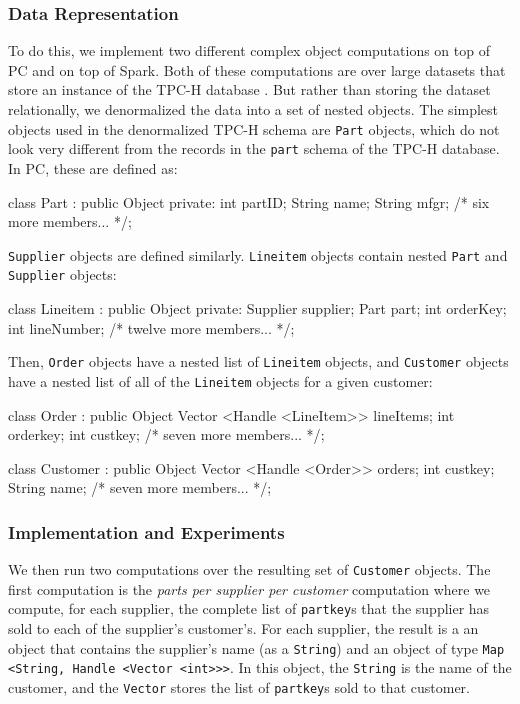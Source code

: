 \subsubsection{Data Representation}

To do this, we implement two different complex object computations on top of PC and on top of Spark.
Both of these computations are over large datasets that store an instance of the TPC-H database \cite{council2008tpc}.
But rather than storing the dataset relationally, we denormalized the data into a set of nested objects. 
The simplest objects used in the denormalized TPC-H schema are 
\texttt{Part} objects, which do not look very different from the records in the  \texttt{part} schema of the TPC-H database.
In PC, these are defined as:

\begin{codesmall}
class Part : public Object {
private:
   int partID;
   String name;
   String mfgr;
   /* six more members... */};
\end{codesmall}

\noindent
\texttt{Supplier} objects are defined similarly.
\texttt{Lineitem} objects contain nested \texttt{Part} and \texttt{Supplier} objects:

\begin{codesmall}
class Lineitem : public Object {
private:
   Supplier supplier;
   Part part;
   int orderKey;
   int lineNumber;
   /* twelve more members... */}; 
\end{codesmall}
 
\noindent Then,
\texttt{Order} objects have a nested list of \texttt{Lineitem} objects, and \texttt{Customer} objects have a nested
list of all of the
\texttt{Lineitem} objects for a given customer:

\begin{codesmall}
class Order : public Object {
   Vector <Handle <LineItem>> lineItems;
   int orderkey;
   int custkey;
   /* seven more members... */};

class Customer : public Object {
   Vector <Handle <Order>> orders;
   int custkey;
   String name;
   /* seven more members... */};
\end{codesmall}

\subsubsection{Implementation and Experiments}
We then run two computations over the resulting set of \texttt{Customer} objects.  
The first computation is the \emph{parts per supplier per customer} computation where we
compute, for each supplier,
the complete list of \texttt{partkey}s that the supplier has sold to each of the supplier's customer's.
For each supplier, the result is a an object that contains the supplier's name (as a \texttt{String}) and
an object of type \texttt{Map <String, Handle <Vector <int}\texttt{>}\texttt{>}\texttt{>}.  In this
object, the \texttt{String} is the name of the customer, and the \texttt{Vector} stores the list of
\texttt{partkey}s sold to that customer.

